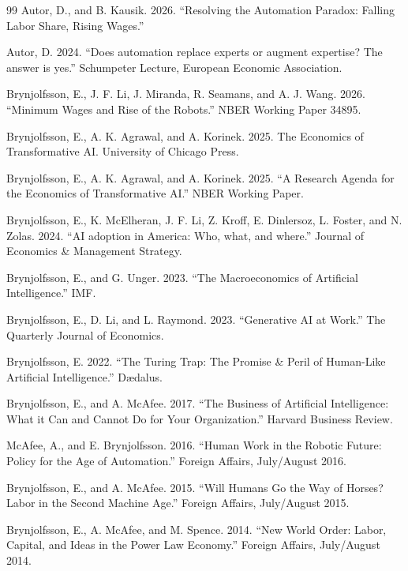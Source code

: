 \documentclass{article}
\renewcommand{\emph}[1]{#1}
\begin{document}
\begin{thebibliography}{99}
Autor, D., and B. Kausik. 2026.
\newblock ``Resolving the Automation Paradox: Falling Labor Share, Rising Wages.''

Autor, D. 2024.
\newblock ``Does automation replace experts or augment expertise? The answer is yes.''
 Schumpeter Lecture, European Economic Association.

Brynjolfsson, E., J. F. Li, J. Miranda, R. Seamans, and A. J. Wang. 2026.
\newblock ``Minimum Wages and Rise of the Robots.''
\newblock NBER Working Paper 34895.

Brynjolfsson, E., A. K. Agrawal, and A. Korinek. 2025.
\newblock \emph{The Economics of Transformative AI}.
\newblock University of Chicago Press.

Brynjolfsson, E., A. K. Agrawal, and A. Korinek. 2025.
\newblock ``A Research Agenda for the Economics of Transformative AI.''
\newblock NBER Working Paper.

Brynjolfsson, E., K. McElheran, J. F. Li, Z. Kroff, E. Dinlersoz, L. Foster, and N. Zolas. 2024.
\newblock ``AI adoption in America: Who, what, and where.''
\newblock \emph{Journal of Economics \& Management Strategy}.

Brynjolfsson, E., and G. Unger. 2023.
\newblock ``The Macroeconomics of Artificial Intelligence.''
\newblock IMF.

Brynjolfsson, E., D. Li, and L. Raymond. 2023.
\newblock ``Generative AI at Work.''
\newblock \emph{The Quarterly Journal of Economics}.

Brynjolfsson, E. 2022.
\newblock ``The Turing Trap: The Promise \& Peril of Human-Like Artificial Intelligence.''
\newblock \emph{D\ae dalus}.

Brynjolfsson, E., and A. McAfee. 2017.
\newblock ``The Business of Artificial Intelligence: What it Can and Cannot Do for Your Organization.''
\newblock \emph{Harvard Business Review}.

McAfee, A., and E. Brynjolfsson. 2016.
\newblock ``Human Work in the Robotic Future: Policy for the Age of Automation.''
\newblock \emph{Foreign Affairs}, July/August 2016.

Brynjolfsson, E., and A. McAfee. 2015.
\newblock ``Will Humans Go the Way of Horses? Labor in the Second Machine Age.''
\newblock \emph{Foreign Affairs}, July/August 2015.

Brynjolfsson, E., A. McAfee, and M. Spence. 2014.
\newblock ``New World Order: Labor, Capital, and Ideas in the Power Law Economy.''
\newblock \emph{Foreign Affairs}, July/August 2014.

\end{thebibliography}
\end{document}
